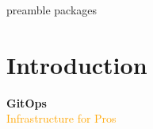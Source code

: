 \RequirePackage{import}
{preamble}
{packages}


    \section{Introduction}\label{sec:introduction}

    \begin{frame}[c]
        \centering
        \Huge
        \textbf{GitOps}
        \\
        \vspace{1ex}
        \Large
        \textcolor{orange}{Infrastructure for Pros}
    \end{frame}



